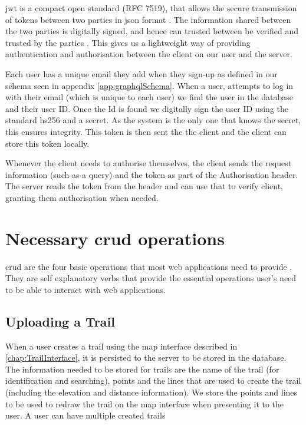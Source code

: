 \acrshort{jwt} is a compact open standard (RFC 7519), that allows the secure transmission of tokens between two parties in  \acrshort{json} format \cite{jones2015json}. The information shared between the two parties is digitally signed, and hence can trusted between be verified and trusted by the parties \cite{auth02019json}. This gives us a lightweight way of providing authentication and authorisation between the client on our user and the server.

Each user has a unique email they add when they sign-up as defined in our schema seen in appendix \autoref{app:graphqlSchema}. When a user, attempts to log in with their email (which is unique to each user) we find the user in the database and their user ID. Once the Id is found we digitally sign the user ID using the standard \acrfull{hs256} and a secret. As the system is the only one that knows the secret, this ensures integrity. This token is then sent the the client and the client can store this token locally.

Whenever the client needs to authorise themselves, the client sends the request information (such as a query) and the token as part of the Authorisation header. The server reads the token from the header and can use that to verify client, granting them authorisation when needed.

\section{Necessary \acrshort{crud} operations}
\acrfull{crud} are the four basic operations that most web applications need to provide \cite{codeacademy2019crud}. They are self explanatory verbs that provide the essential operations user's need to be able to interact with web applications.

\subsection{Uploading a Trail}
When a user creates a trail using the map interface described in \autoref{chap:TrailInterface}, it is persisted to the server to be stored in the database. The information needed to be stored for trails are the name of the trail (for identification and searching), points and the lines that are used to create the trail (including the elevation and distance information). We store the points and lines to be used to redraw the trail on the map interface when presenting it to the user. A user can have multiple created trails

